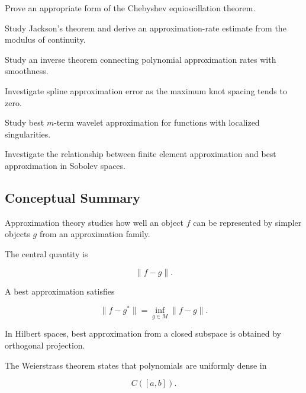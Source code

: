 \begin{exercise}[4]
Prove an appropriate form of the Chebyshev equioscillation theorem.
\end{exercise}

\begin{exercise}[4]
Study Jackson's theorem and derive an approximation-rate estimate from
the modulus of continuity.
\end{exercise}

\begin{exercise}[4]
Study an inverse theorem connecting polynomial approximation rates with
smoothness.
\end{exercise}

\begin{exercise}[4]
Investigate spline approximation error as the maximum knot spacing tends
to zero.
\end{exercise}

\begin{exercise}[4]
Study best \(m\)-term wavelet approximation for functions with localized
singularities.
\end{exercise}

\begin{exercise}[4]
Investigate the relationship between finite element approximation and
best approximation in Sobolev spaces.
\end{exercise}

\subsection{Conceptual Summary}
\label{subsec:approximation-theory-summary}

Approximation theory studies how well an object \(f\) can be represented
by simpler objects \(g\) from an approximation family.

The central quantity is

\[
\boxed{
\|f-g\|.
}
\]

A best approximation satisfies

\[
\boxed{
\|f-g^\ast\|
=
\inf_{g\in M}\|f-g\|.
}
\]

In Hilbert spaces, best approximation from a closed subspace is obtained
by orthogonal projection.

The Weierstrass theorem states that polynomials are uniformly dense in

\[
\boxed{
C([a,b]).
}
\]

